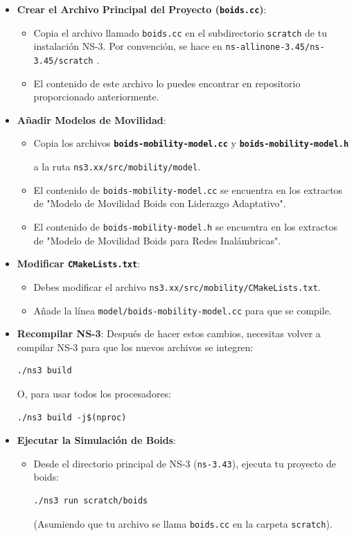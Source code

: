 \documentclass{article}
\begin{document}
\begin{itemize}
    \item \textbf{Crear el Archivo Principal del Proyecto (\texttt{boids.cc})}:
    \begin{itemize}
        \item Copia el archivo llamado \texttt{boids.cc} en el subdirectorio \texttt{scratch} de tu instalación NS-3. Por convención, se hace en \texttt{ns-allinone-3.45/ns-3.45/scratch} .
        \item El contenido de este archivo lo puedes encontrar en repositorio proporcionado anteriormente.
    \end{itemize}
    \item \textbf{Añadir Modelos de Movilidad}:
    \begin{itemize}
        \item Copia los archivos \textbf{\texttt{boids-mobility-model.cc}} y 
            \textbf{\texttt{boids-mobility-model.h}} 
            
            a la ruta \texttt{ns3.xx/src/mobility/model}.
        \item El contenido de \texttt{boids-mobility-model.cc} se encuentra en los extractos de "Modelo de Movilidad Boids con Liderazgo Adaptativo".
        \item El contenido de \texttt{boids-mobility-model.h} se encuentra en los extractos de "Modelo de Movilidad Boids para Redes Inalámbricas".
    \end{itemize}
    \item \textbf{Modificar \texttt{CMakeLists.txt}}:
    \begin{itemize}
        \item Debes modificar el archivo \texttt{ns3.xx/src/mobility/CMakeLists.txt}.
        \item Añade la línea \texttt{model/boids-mobility-model.cc} para que se compile.
    \end{itemize}
    \item \textbf{Recompilar NS-3}: Después de hacer estos cambios, necesitas volver a compilar NS-3 para que los nuevos archivos se integren:
    \begin{lstlisting}
./ns3 build 
    \end{lstlisting}
    O, para usar todos los procesadores:
    \begin{lstlisting}
./ns3 build -j$(nproc) 
    \end{lstlisting}
    \item \textbf{Ejecutar la Simulación de Boids}:
    \begin{itemize}
        \item Desde el directorio principal de NS-3 (\texttt{ns-3.43}), ejecuta tu proyecto de boids:
        \begin{lstlisting}
./ns3 run scratch/boids 
        \end{lstlisting}
        (Asumiendo que tu archivo se llama \texttt{boids.cc} en la carpeta \texttt{scratch}).
    \end{itemize}
\end{itemize}
\end{document}
